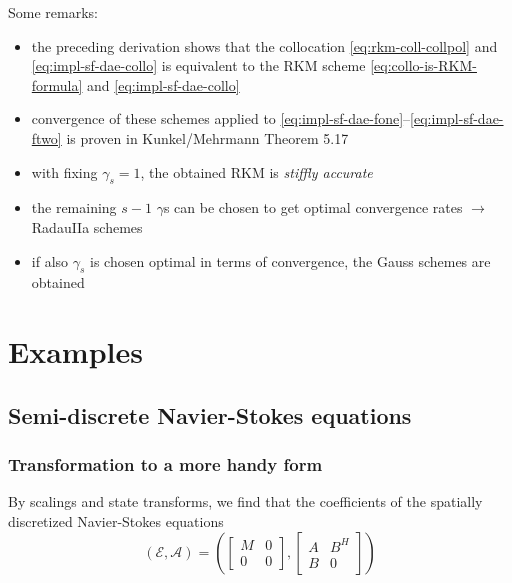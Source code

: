 \documentclass[]{book}
\providecommand{\tightlist}{%
  \setlength{\itemsep}{0pt}\setlength{\parskip}{0pt}}
\theoremstyle{definition}
\theoremstyle{definition}
\theoremstyle{definition}
\theoremstyle{definition}
\theoremstyle{remark}
\begin{document}
Some remarks:

\begin{itemize}
\tightlist
\item
  the preceding derivation shows that the collocation \eqref{eq:rkm-coll-collpol} and \eqref{eq:impl-sf-dae-collo} is equivalent to the RKM scheme \eqref{eq:collo-is-RKM-formula} and \eqref{eq:impl-sf-dae-collo}
\item
  convergence of these schemes applied to \eqref{eq:impl-sf-dae-fone}--\eqref{eq:impl-sf-dae-ftwo} is proven in Kunkel/Mehrmann Theorem 5.17
\item
  with fixing \(\gamma_s=1\), the obtained RKM is \emph{stiffly accurate}
\item
  the remaining \(s-1\) \(\gamma\)s can be chosen to get optimal convergence rates \(\rightarrow\) RadauIIa schemes
\item
  if also \(\gamma_s\) is chosen optimal in terms of convergence, the Gauss schemes are obtained
\end{itemize}

\hypertarget{examples-1}{%
\chapter{Examples}\label{examples-1}}

\hypertarget{semi-discrete-navier-stokes-equations}{%
\section{Semi-discrete Navier-Stokes equations}\label{semi-discrete-navier-stokes-equations}}

\hypertarget{transformation-to-a-more-handy-form}{%
\subsection{Transformation to a more handy form}\label{transformation-to-a-more-handy-form}}

By scalings and state transforms, we find that the coefficients of the spatially discretized Navier-Stokes equations
\begin{equation}\label{eq:x-lin-sd-nse}
(\mathcal E, \mathcal A )= \left(
\begin{bmatrix} M & 0 \\ 0 & 0 \end{bmatrix}
,
\begin{bmatrix} A & B^H \\ B & 0 \end{bmatrix}
\right )
\end{equation}
\end{document}
